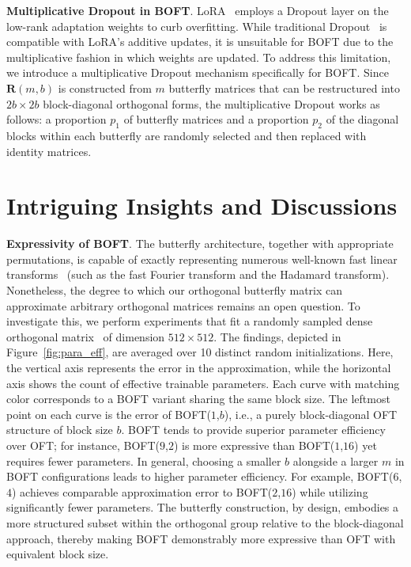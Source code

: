 \textbf{Multiplicative Dropout in BOFT}. LoRA~\cite{hulora2022} employs a Dropout layer on the low-rank adaptation weights to curb overfitting. While traditional Dropout~\cite{srivastava2014dropout} is compatible with LoRA’s additive updates, it is unsuitable for BOFT due to the multiplicative fashion in which weights are updated. To address this limitation, we introduce a multiplicative Dropout mechanism specifically for BOFT. Since $\bm{R}(m,b)$ is constructed from $m$ butterfly matrices that can be restructured into $2b\times 2b$ block-diagonal orthogonal forms, the multiplicative Dropout works as follows: a proportion $p_1$ of butterfly matrices and a proportion $p_2$ of the diagonal blocks within each butterfly are randomly selected and then replaced with identity matrices.

\section{Intriguing Insights and Discussions}

\textbf{Expressivity of BOFT}. The butterfly architecture, together with appropriate permutations, is capable of exactly representing numerous well-known fast linear transforms~\cite{dao2019learning,dao2019kaleidoscope} (such as the fast Fourier transform and the Hadamard transform). Nonetheless, the degree to which our orthogonal butterfly matrix can approximate arbitrary orthogonal matrices remains an open question. To investigate this, we perform experiments that fit a randomly sampled dense orthogonal matrix~\cite{anderson1987generation} of dimension $512\times 512$. The findings, depicted in Figure~\ref{fig:para_eff}, are averaged over 10 distinct random initializations. Here, the vertical axis represents the error in the approximation, while the horizontal axis shows the count of effective trainable parameters. Each curve with matching color corresponds to a BOFT variant sharing the same block size. The leftmost point on each curve is the error of BOFT($1$,$b$), i.e., a purely block-diagonal OFT structure of block size $b$. BOFT tends to provide superior parameter efficiency over OFT; for instance, BOFT($9$,$2$) is more expressive than BOFT($1$,$16$) yet requires fewer parameters. In general, choosing a smaller $b$ alongside a larger $m$ in BOFT configurations leads to higher parameter efficiency. For example, BOFT($6$,$4$) achieves comparable approximation error to BOFT($2$,$16$) while utilizing significantly fewer parameters. The butterfly construction, by design, embodies a more structured subset within the orthogonal group relative to the block-diagonal approach, thereby making BOFT demonstrably more expressive than OFT with equivalent block size.

